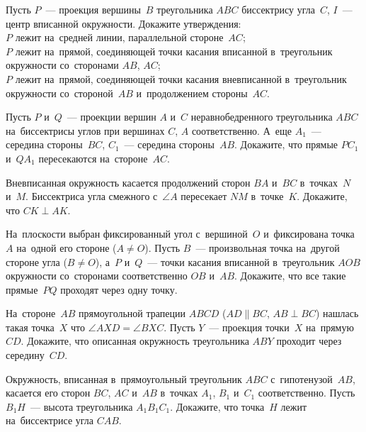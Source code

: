 


\begin{problems}

\item
Пусть $P$~--- проекция вершины~$B$ треугольника $ABC$ биссектрису угла~$C$,
$I$~--- центр вписанной окружности.
Докажите утверждения:
\\
\subproblem
$P$ лежит на~средней линии, параллельной стороне~$AC$;
\\
\subproblem
$P$ лежит на~прямой, соединяющей точки касания вписанной в~треугольник
окружности со~сторонами $AB$, $AC$;
\\
\subproblem
$P$ лежит на~прямой, соединяющей точки касания вневписанной в~треугольник
окружности со~стороной~$AB$ и~продолжением стороны~$AC$.

\item
Пусть $P$ и~$Q$~--- проекции вершин $A$ и~$C$ неравнобедренного
треугольника $ABC$ на~биссектрисы углов при вершинах $C$, $A$ соответственно.
А~еще $A_{1}$~--- середина стороны~$BC$, $C_{1}$~--- середина стороны~$AB$.
Докажите, что прямые $PC_{1}$ и~$QA_{1}$ пересекаются на~стороне~$AC$.

\item
Вневписанная окружность касается продолжений сторон $BA$ и~$BC$
в~точках~$N$ и~$M$.
Биссектриса угла смежного с~$\angle A$ пересекает $NM$ в~точке~$K$.
Докажите, что $CK \perp AK$.

\item
На~плоскости выбран фиксированный угол с~вершиной~$O$ и~фиксирована точка~$A$
на~одной его стороне ($A \neq O$).
Пусть $B$~--- произвольная точка на~другой стороне угла ($B \neq O$),
а~$P$ и~$Q$~--- точки касания вписанной в~треугольник $AOB$ окружности
со~сторонами соответственно $OB$ и~$AB$.
Докажите, что все такие прямые~$PQ$ проходят через одну точку.

\item
На~стороне~$AB$ прямоугольной трапеции $ABCD$
($AD \parallel BC$, $AB \perp BC$) нашлась такая точка~$X$ что
$\angle AXD = \angle BXC$.
Пусть $Y$~--- проекция точки~$X$ на~прямую~$CD$.
Докажите, что описанная окружность треугольника $ABY$ проходит через
середину~$CD$.

\item
Окружность, вписанная в~прямоугольный треугольник $ABC$ с~гипотенузой~$AB$,
касается его сторон $BC$, $AC$ и~$AB$ в~точках $A_{1}$, $B_{1}$ и~$C_{1}$
соответственно.
Пусть $B_{1}H$~--- высота треугольника $A_{1}B_{1}C_{1}$.
Докажите, что точка~$H$ лежит на~биссектрисе угла $CAB$.


\end{problems}
